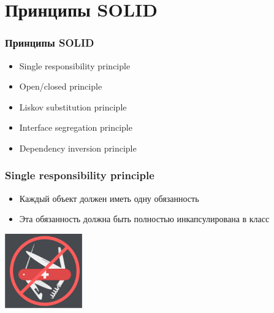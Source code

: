 \documentclass{../../slides-style}
\begin{document}
    \section{Принципы SOLID}

    \begin{frame}
        \frametitle{Принципы SOLID}
        \begin{itemize}
            \item Single responsibility principle
            \item Open/closed principle
            \item Liskov substitution principle
            \item Interface segregation principle
            \item Dependency inversion principle
        \end{itemize}
    \end{frame}

    \begin{frame}
        \frametitle{Single responsibility principle}
        \begin{itemize}
            \item Каждый объект должен иметь одну обязанность
            \item Эта обязанность должна быть полностью инкапсулирована в класс
        \end{itemize}
        \begin{flushright}
            \includegraphics[width=0.25\textwidth]{singleResponsibility.png}
        \end{flushright}
    \end{frame}
\end{document}
